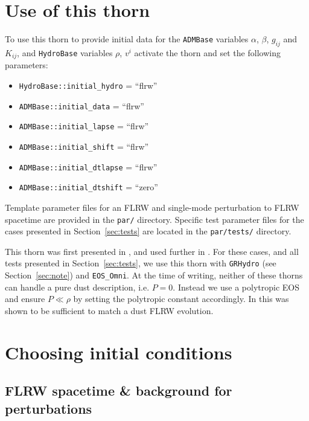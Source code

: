 \section{Use of this thorn}
\label{sec:use}

To use this thorn to provide initial data for the {\tt ADMBase} variables $\alpha$, $\beta$, $g_{ij}$ and $K_{ij}$, and {\tt HydroBase} variables $\rho$, $v^i$ activate the thorn and set the following parameters: 
\begin{itemize}
	\item \texttt{HydroBase::initial\_hydro} = ``flrw''
	\item \texttt{ADMBase::initial\_data} = ``flrw''
	\item \texttt{ADMBase::initial\_lapse} = ``flrw''
	\item \texttt{ADMBase::initial\_shift} = ``flrw''
	\item \texttt{ADMBase::initial\_dtlapse} = ``flrw''
	\item \texttt{ADMBase::initial\_dtshift} = ``zero''
\end{itemize}

Template parameter files for an FLRW and single-mode perturbation to FLRW spacetime are provided in the {\tt par/} directory. Specific test parameter files for the cases presented in Section~\ref{sec:tests} are located in the {\tt par/tests/} directory. 

This thorn was first presented in \cite{macpherson2017}, and used further in \cite{macpherson2019}. For these cases, and all tests presented in Section~\ref{sec:tests}, we use this thorn with {\tt GRHydro} (see Section~\ref{sec:note}) and {\tt EOS\_Omni}. At the time of writing, neither of these thorns can handle a pure dust description, i.e. $P=0$. Instead we use a polytropic EOS and ensure $P\ll\rho$ by setting the polytropic constant accordingly. In \cite{macpherson2017} this was shown to be sufficient to match a dust FLRW evolution. 




\section{Choosing initial conditions}
\label{sec:eqn}

\subsection{FLRW spacetime \& background for perturbations} \label{sec:FLRWinit}

